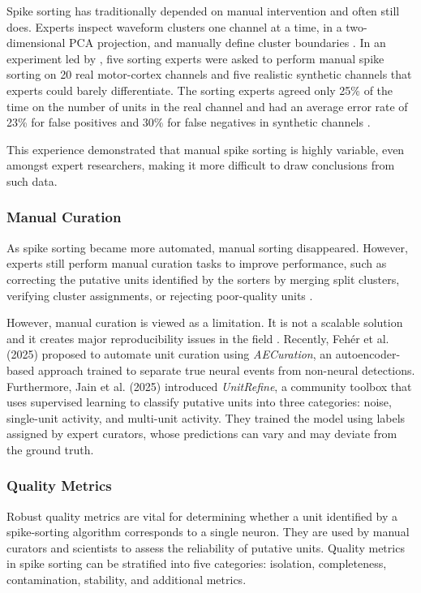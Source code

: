 Spike sorting has traditionally depended on manual intervention and often still does. Experts inspect waveform clusters one channel at a time, in a two-dimensional PCA projection, and manually define cluster boundaries \parencite{Wood2004}. In an experiment led by \textcite{Wood2004}, five sorting experts were asked to perform manual spike sorting on 20 real motor-cortex channels and five realistic synthetic channels that experts could barely differentiate. The sorting experts agreed only 25\% of the time on the number of units in the real channel and had an average error rate of 23\% for false positives and 30\% for false negatives in synthetic channels \parencite{Wood2004}.

This experience demonstrated that manual spike sorting is highly variable, even amongst expert researchers, making it more difficult to draw conclusions from such data.

\subsubsection{Manual Curation}

As spike sorting became more automated, manual sorting disappeared. However, experts still perform manual curation tasks to improve performance, such as correcting the putative units identified by the sorters by merging split clusters, verifying cluster assignments, or rejecting poor-quality units \parencite{Rossant2016}.

However, manual curation is viewed as a limitation. It is not a scalable solution and it creates major reproducibility issues in the field \parencite{Rossant2016,Buccino2020SpikeInterface}. Recently, Fehér et al. (2025) proposed to automate unit curation using \emph{AECuration}, an autoencoder-based approach trained to separate true neural events from non-neural detections. Furthermore, Jain et al. (2025) introduced \emph{UnitRefine}, a community toolbox that uses supervised learning to classify putative units into three categories: noise, single-unit activity, and multi-unit activity. They trained the model using labels assigned by expert curators, whose predictions can vary and may deviate from the ground truth.

\subsubsection{Quality Metrics}

Robust quality metrics are vital for determining whether a unit identified by a spike-sorting algorithm corresponds to a single neuron. They are used by manual curators and scientists to assess the reliability of putative units. Quality metrics in spike sorting can be stratified into five categories: isolation, completeness, contamination, stability, and additional metrics.

